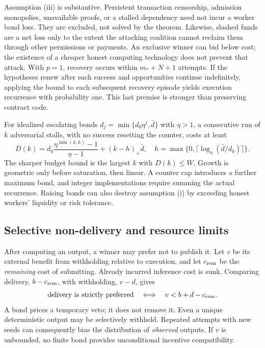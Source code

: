 \documentclass[10pt,letterpaper]{article}
\begin{document}
Assumption (iii) is substantive. Persistent transaction censorship, admission monopolies, unavailable proofs, or a stalled dependency need not incur a worker bond loss. They are excluded, not solved by the theorem. Likewise, slashed funds are a net loss only to the extent the attacking coalition cannot reclaim them through other permissions or payments. An exclusive winner can bid below cost; the existence of a cheaper honest computing technology does not prevent that attack. With $p=1$, recovery occurs within $m_*+N+1$ attempts. If the hypotheses renew after each success and opportunities continue indefinitely, applying the bound to each subsequent recovery episode yields execution recurrence with probability one. This last premise is stronger than preserving contract code.

For idealized escalating bonds $d_j=\min\{d_0\eta^j,\bar d\}$ with $\eta>1$, a consecutive run of $k$ adversarial stalls, with no success resetting the counter, costs at least
\begin{equation}
 D(k)=d_0\frac{\eta^{\min(k,h)}-1}{\eta-1}+(k-h)_+\bar d,
 \quad h=\max\{0,\lceil\log_\eta(\bar d/d_0)\rceil\}.
 \label{eq:stall}
\end{equation}
The sharper budget bound is the largest $k$ with $D(k)\leq W$. Growth is geometric only before saturation, then linear. A counter cap introduces a further maximum bond, and integer implementations require summing the actual recurrence. Raising bonds can also destroy assumption (i) by exceeding honest workers' liquidity or risk tolerance.

\subsection{Selective non-delivery and resource limits}
After computing an output, a winner may prefer not to publish it. Let $v$ be its external benefit from withholding relative to execution, and let $c_{\rm rem}$ be the \emph{remaining} cost of submitting. Already incurred inference cost is sunk. Comparing delivery, $b-c_{\rm rem}$, with withholding, $v-d$, gives
\begin{equation}
 \text{delivery is strictly preferred}\quad\Longleftrightarrow\quad
 v<b+d-c_{\rm rem}. \label{eq:veto}
\end{equation}
A bond prices a temporary veto; it does not remove it. Even a unique deterministic output may be selectively withheld. Repeated attempts with new seeds can consequently bias the distribution of \emph{observed} outputs. If $v$ is unbounded, no finite bond provides unconditional incentive compatibility.
\end{document}
